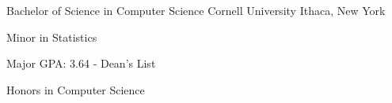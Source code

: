 

\begin{cventries}

  \cventry
    {Bachelor of Science in Computer Science} %
    {Cornell University} %
    {Ithaca, New York} %
    {} %
    {
      \begin{cvitems} %
        \item {Minor in Statistics}
        \item {Major GPA: 3.64 - Dean's List}
        \item {Honors in Computer Science}
      \end{cvitems}
    }

\end{cventries}